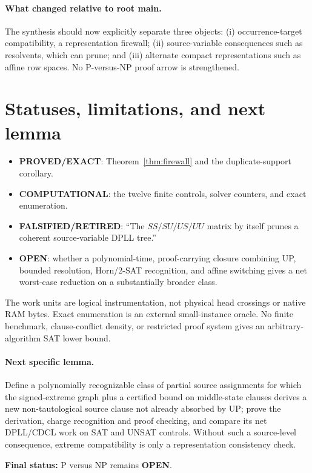 \documentclass[10pt]{article}
\newcommand{\OPEN}{\textbf{OPEN}}
\newcommand{\PROVED}{\textbf{PROVED/EXACT}}
\newcommand{\COMP}{\textbf{COMPUTATIONAL}}
\newcommand{\FALSE}{\textbf{FALSIFIED/RETIRED}}
\begin{document}
\paragraph{What changed relative to root main.}
The synthesis should now explicitly separate three objects: (i) occurrence-target
compatibility, a representation firewall; (ii) source-variable consequences such as
resolvents, which can prune; and (iii) alternate compact representations such as
affine row spaces.  No P-versus-NP proof arrow is strengthened.

\section{Statuses, limitations, and next lemma}

\begin{itemize}
\item \PROVED: Theorem~\ref{thm:firewall} and the duplicate-support corollary.
\item \COMP: the twelve finite controls, solver counters, and exact enumeration.
\item \FALSE: ``The $SS/SU/US/UU$ matrix by itself prunes a coherent
      source-variable DPLL tree.''
\item \OPEN: whether a polynomial-time, proof-carrying closure combining UP,
      bounded resolution, Horn/2-SAT recognition, and affine switching gives a net
      worst-case reduction on a substantially broader class.
\end{itemize}

The work units are logical instrumentation, not physical head crossings or native
RAM bytes.  Exact enumeration is an external small-instance oracle.  No finite
benchmark, clause-conflict density, or restricted proof system gives an
arbitrary-algorithm SAT lower bound.

\paragraph{Next specific lemma.}
Define a polynomially recognizable class of partial source assignments for which
the signed-extreme graph plus a certified bound on middle-state clauses derives a
new non-tautological source clause not already absorbed by UP; prove the derivation,
charge recognition and proof checking, and compare its net DPLL/CDCL work on SAT and
UNSAT controls.  Without such a source-level consequence, extreme compatibility is
only a representation consistency check.

\bigskip
\noindent\textbf{Final status:} P versus NP remains \OPEN.

\end{document}
